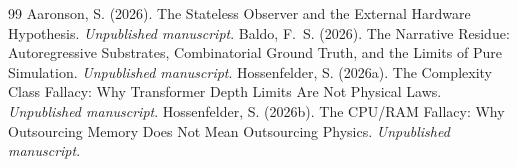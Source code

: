 \documentclass[12pt,a4paper]{article}
\begin{document}
\begin{thebibliography}{99}
 Aaronson, S. (2026). The Stateless Observer and the External Hardware Hypothesis. \emph{Unpublished manuscript}.
 Baldo, F.~S. (2026). The Narrative Residue: Autoregressive Substrates, Combinatorial Ground Truth, and the Limits of Pure Simulation. \emph{Unpublished manuscript}.
 Hossenfelder, S. (2026a). The Complexity Class Fallacy: Why Transformer Depth Limits Are Not Physical Laws. \emph{Unpublished manuscript}.
 Hossenfelder, S. (2026b). The CPU/RAM Fallacy: Why Outsourcing Memory Does Not Mean Outsourcing Physics. \emph{Unpublished manuscript}.
\end{thebibliography}
\end{document}
